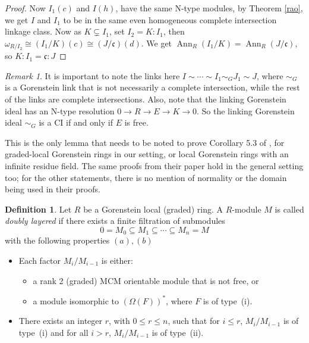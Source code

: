 \documentclass[11pt,letterpaper]{amsart}
\newcommand{\seq}{\subseteq}
\newcommand{\x}{\xrightarrow{}}
\DeclareMathOperator{\Ann}{Ann}
\theoremstyle{plain}
\theoremstyle{definition}
\newtheorem{defi}[thm]{Definition}
\theoremstyle{remark}
\newtheorem{remark}[thm]{Remark}
\begin{document}
\begin{proof}
Now $I_1(c)$ and $I(h)$, have the same N-type modules, by Theorem \ref{rao}, we get $I$ and $I_1$ to be in the same even homogeneous complete intersection linkage class. Now as $K\subsetneq I_1$, set $I_2=K:I_1$, then $\omega_{R/I_2}\cong (I_1/K)(c)\cong (J/\mathfrak c)(d)$. We get $\Ann_R(I_1/K)=\Ann_R(J/\mathfrak c)$, so $K:I_1=\mathfrak{c}:J$%
\end{proof}

\begin{remark}\label{linksin3.4CDH}
    It is important to note the links here $I\sim\cdots\sim I_1\sim_G J_1\sim J$, where $\sim_G$ is a Gorenstein link that is not necessarily a complete intersection, while the rest of the links are complete intersections. Also, note that the linking Gorenstein ideal has an N-type resolution $0\x R\x E\x K\x 0$. So the linking Gorenstein ideal $\sim_G$ is a CI if and only if $E$ is free.
\end{remark}
This is the only lemma that needs to be noted to prove Corollary 5.3 of \cite{CasanellasDrozdHartshorne+2005+149+171}, for graded-local Gorenstein rings in our setting, or local Gorenstein rings with an infinite residue field. The same proofs from their paper hold in the general setting too; for the other statements, there is no mention of normality or the domain being used in their proofs. 

\begin{defi}\cite[Definition~4.4]{CasanellasDrozdHartshorne+2005+149+171}\label{doublylayereddefinition} Let $R$ be a Gorenstein local (graded) ring. A $R$-module $M$ is called \emph{doubly layered} if there exists a finite filtration of submodules $$0=M_0\seq M_1\seq\cdots\seq M_n=M$$ with the following properties $(a),(b)$
\begin{itemize}
    \item[$(a)$] Each factor $M_{i}/M_{i-1}$ is either:
    \begin{itemize}
        \item[(i)] a rank 2 (graded) MCM orientable module that is not free, or
        \item[(ii)] a module isomorphic to $(\Omega(F))^*$, where $F$ is of type~(i).
    \end{itemize}
    \item[(b)] There exists an integer $r$, with $0\le r\le n$, such that for $i\le r$, $M_{i}/M_{i-1}$ is of type~(i) and for all $i>r$, $M_{i}/M_{i-1}$ is of type~(ii). 
\end{itemize}    
\end{defi}
\end{document}
